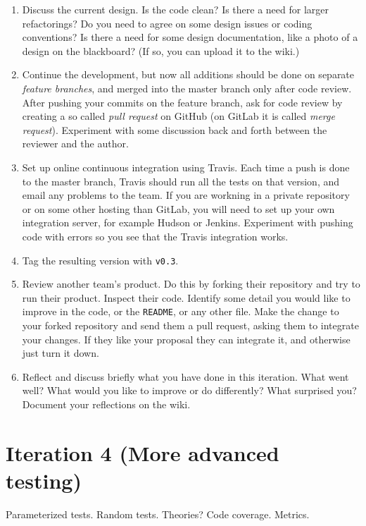 \documentclass[swedish,english]{article}
\begin{document}
\begin{enumerate}
\item Discuss the current design. Is the code clean? Is there a need for larger refactorings? Do you need to agree on some design issues or coding conventions? Is there a need for some design documentation, like a photo of a design on the blackboard? (If so, you can upload it to the wiki.)
\item Continue the development, but now all additions should be done on separate \emph{feature branches}, and merged into the master branch only after code review. After pushing your commits on the feature branch, ask for code review by creating a so called \emph{pull request} on GitHub (on GitLab it is called \emph{merge request}). Experiment with some discussion back and forth between the reviewer and the author.
\item Set up online continuous integration using Travis. Each time a push is done to the master branch, Travis should run all the tests on that version, and email any problems to the team. If you are workning in a private repository or on some other hosting than GitLab, you will need to set up your own integration server, for example Hudson or Jenkins. Experiment with pushing code with errors so you see that the Travis integration works.
\item Tag the resulting version with \verb'v0.3'.
\item Review another team's product. Do this by forking their repository and try to run their product. Inspect their code. Identify some detail you would like to improve in the code, or the \verb'README', or any other file. Make the change to your forked repository and send them a pull request, asking them to integrate your changes. If they like your proposal they can integrate it, and otherwise just turn it down.
\item Reflect and discuss briefly what you have done in this iteration. What went well? What would you like to improve or do differently? What surprised you? Document your reflections on the wiki.
\end{enumerate}

\section*{Iteration 4 (More advanced testing)}

Parameterized tests.
Random tests.
Theories?
Code coverage.
Metrics.
\end{document}
